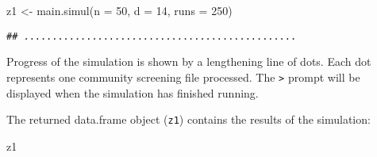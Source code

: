 \documentclass[
  12pt,
  a4paper]{book}
\newenvironment{Shaded}{\begin{snugshade}}{\end{snugshade}}
\newcommand{\AttributeTok}[1]{\textcolor[rgb]{0.77,0.63,0.00}{#1}}
\newcommand{\DecValTok}[1]{\textcolor[rgb]{0.00,0.00,0.81}{#1}}
\newcommand{\FunctionTok}[1]{\textcolor[rgb]{0.00,0.00,0.00}{#1}}
\newcommand{\NormalTok}[1]{#1}
\newcommand{\OtherTok}[1]{\textcolor[rgb]{0.56,0.35,0.01}{#1}}
\begin{document}
\begin{Shaded}
\begin{Highlighting}[]
\NormalTok{z1 }\OtherTok{\textless{}{-}} \FunctionTok{main.simul}\NormalTok{(}\AttributeTok{n =} \DecValTok{50}\NormalTok{, }\AttributeTok{d =} \DecValTok{14}\NormalTok{, }\AttributeTok{runs =} \DecValTok{250}\NormalTok{)}
\end{Highlighting}
\end{Shaded}

\begin{verbatim}
## ................................................
\end{verbatim}

Progress of the simulation is shown by a lengthening line of dots. Each dot represents one community screening file processed. The \texttt{\textgreater{}} prompt will be displayed when the simulation has finished running.

The returned data.frame object (\texttt{z1}) contains the results of the simulation:

\begin{Shaded}
\begin{Highlighting}[]
\NormalTok{z1}
\end{Highlighting}
\end{Shaded}
\end{document}
